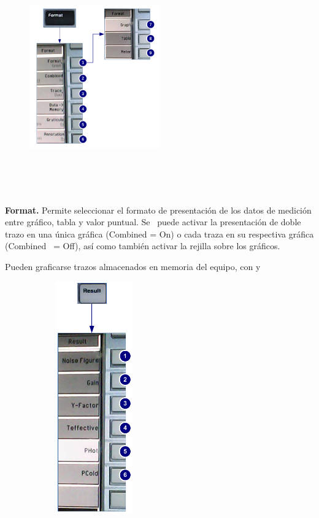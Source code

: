 {	\begin{minipage}[t][10cm]{\textwidth}
		\begin{figure}		
			\centering
			\includegraphics[width=0.5\textwidth, height=10cm, keepaspectratio]{./Imagenes/MenuFormatN8975A.pdf}	
		\end{figure}
		
		\textbf{Format.} Permite	seleccionar el formato de presentación de los datos de medición entre gráfico, tabla y valor puntual. Se \ puede activar la presentación de doble trazo en una única gráfica (Combined = On) o cada traza en su respectiva gráfica (Combined \ = Off), así como también activar la rejilla sobre los gráficos. 
		
		Pueden graficarse trazos almacenados en memoria del equipo, con y	
	\end{minipage}

	\begin{minipage}[t][10cm]{\textwidth}
		\begin{figure}		
			\includegraphics[width=0.5\textwidth, height=10cm, keepaspectratio]{./Imagenes/MenuResultN8975A.pdf}	
		\end{figure}
		

\end{minipage}}
